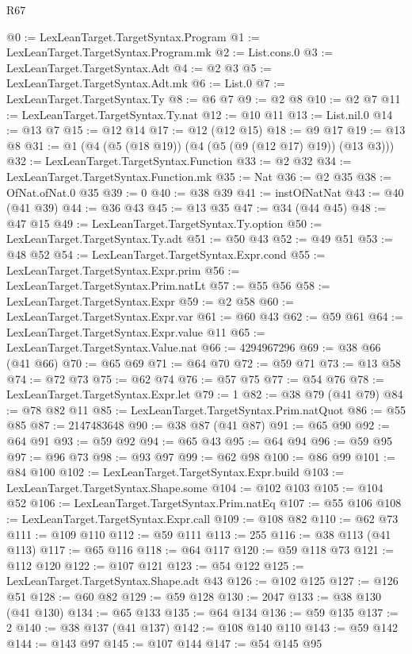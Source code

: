 \begin{lexlean}{R67}
\begin{coremodule}
@0 := LexLeanTarget.TargetSyntax.Program
@1 := LexLeanTarget.TargetSyntax.Program.mk
@2 := List.cons.{0}
@3 := LexLeanTarget.TargetSyntax.Adt
@4 := @2 @3
@5 := LexLeanTarget.TargetSyntax.Adt.mk
@6 := List.{0}
@7 := LexLeanTarget.TargetSyntax.Ty
@8 := @6 @7
@9 := @2 @8
@10 := @2 @7
@11 := LexLeanTarget.TargetSyntax.Ty.nat
@12 := @10 @11
@13 := List.nil.{0}
@14 := @13 @7
@15 := @12 @14
@17 := @12 (@12 @15)
@18 := @9 @17
@19 := @13 @8
@31 := @1 (@4 (@5 (@18 @19)) (@4 (@5 (@9 (@12 @17) @19)) (@13 @3)))
@32 := LexLeanTarget.TargetSyntax.Function
@33 := @2 @32
@34 := LexLeanTarget.TargetSyntax.Function.mk
@35 := Nat
@36 := @2 @35
@38 := OfNat.ofNat.{0} @35
@39 := 0
@40 := @38 @39
@41 := instOfNatNat
@43 := @40 (@41 @39)
@44 := @36 @43
@45 := @13 @35
@47 := @34 (@44 @45)
@48 := @47 @15
@49 := LexLeanTarget.TargetSyntax.Ty.option
@50 := LexLeanTarget.TargetSyntax.Ty.adt
@51 := @50 @43
@52 := @49 @51
@53 := @48 @52
@54 := LexLeanTarget.TargetSyntax.Expr.cond
@55 := LexLeanTarget.TargetSyntax.Expr.prim
@56 := LexLeanTarget.TargetSyntax.Prim.natLt
@57 := @55 @56
@58 := LexLeanTarget.TargetSyntax.Expr
@59 := @2 @58
@60 := LexLeanTarget.TargetSyntax.Expr.var
@61 := @60 @43
@62 := @59 @61
@64 := LexLeanTarget.TargetSyntax.Expr.value @11
@65 := LexLeanTarget.TargetSyntax.Value.nat
@66 := 4294967296
@69 := @38 @66 (@41 @66)
@70 := @65 @69
@71 := @64 @70
@72 := @59 @71
@73 := @13 @58
@74 := @72 @73
@75 := @62 @74
@76 := @57 @75
@77 := @54 @76
@78 := LexLeanTarget.TargetSyntax.Expr.let
@79 := 1
@82 := @38 @79 (@41 @79)
@84 := @78 @82 @11
@85 := LexLeanTarget.TargetSyntax.Prim.natQuot
@86 := @55 @85
@87 := 2147483648
@90 := @38 @87 (@41 @87)
@91 := @65 @90
@92 := @64 @91
@93 := @59 @92
@94 := @65 @43
@95 := @64 @94
@96 := @59 @95
@97 := @96 @73
@98 := @93 @97
@99 := @62 @98
@100 := @86 @99
@101 := @84 @100
@102 := LexLeanTarget.TargetSyntax.Expr.build
@103 := LexLeanTarget.TargetSyntax.Shape.some
@104 := @102 @103
@105 := @104 @52
@106 := LexLeanTarget.TargetSyntax.Prim.natEq
@107 := @55 @106
@108 := LexLeanTarget.TargetSyntax.Expr.call
@109 := @108 @82
@110 := @62 @73
@111 := @109 @110
@112 := @59 @111
@113 := 255
@116 := @38 @113 (@41 @113)
@117 := @65 @116
@118 := @64 @117
@120 := @59 @118 @73
@121 := @112 @120
@122 := @107 @121
@123 := @54 @122
@125 := LexLeanTarget.TargetSyntax.Shape.adt @43
@126 := @102 @125
@127 := @126 @51
@128 := @60 @82
@129 := @59 @128
@130 := 2047
@133 := @38 @130 (@41 @130)
@134 := @65 @133
@135 := @64 @134
@136 := @59 @135
@137 := 2
@140 := @38 @137 (@41 @137)
@142 := @108 @140 @110
@143 := @59 @142
@144 := @143 @97
@145 := @107 @144
@147 := @54 @145 @95

\end{coremodule}
\end{lexlean}
